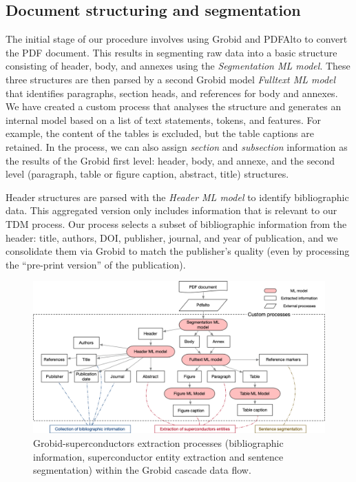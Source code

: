 \subsection{Document structuring and segmentation}

The initial stage of our procedure involves using Grobid and PDFAlto to convert the PDF document. This results in segmenting raw data into a basic structure consisting of header, body, and annexes using the \emph{Segmentation ML model}.
These three structures are then parsed by a second Grobid model \emph{Fulltext ML model} that identifies paragraphs, section heads, and references for body and annexes. 
We have created a custom process that analyses the structure and generates an internal model based on a list of text statements, tokens, and features. For example, the content of the tables is excluded, but the table captions are retained.
In the process, we can also assign \textit{section} and \textit{subsection} information as the results of the Grobid first level: header, body, and annexe, and the second level (paragraph, table or figure caption, abstract, title) structures.

Header structures are parsed with the \emph{Header ML model} to identify bibliographic data. 
This aggregated version only includes information that is relevant to our TDM process. 
Our process selects a subset of bibliographic information from the header: title, authors, DOI, publisher, journal, and year of publication, and we consolidate them via Grobid to match the publisher's quality (even by processing the ``pre-print version'' of the publication).

\begin{figure}[htbp]
    \includegraphics[width=\textwidth]{figures/automatic_extraction_supercon/document-structuring-colors}
    \caption{Grobid-superconductors extraction processes (bibliographic information, superconductor entity extraction and sentence segmentation) within the Grobid cascade data flow.}
    \label{fig:grobid-document-processing}
\end{figure}

